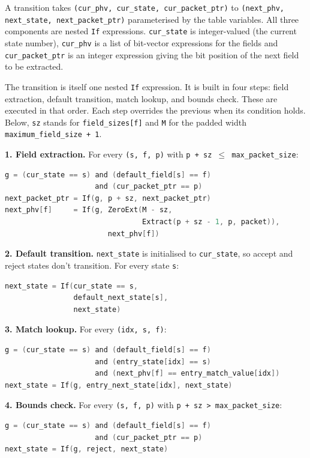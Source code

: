 A transition takes
\texttt{(cur\_phv, cur\_state, cur\_packet\_ptr)} to
\texttt{(next\_phv, next\_state, next\_packet\_ptr)} parameterised
by the table variables. All three components are nested \texttt{If} expressions.
\texttt{cur\_state} is integer-valued (the current state number),
\texttt{cur\_phv} is a list of bit-vector expressions for the fields and
\texttt{cur\_packet\_ptr} is an integer expression giving the bit
position of the next field to be extracted.

The transition is itself one nested \texttt{If} expression. It is
built in four steps: field extraction, default transition,
match lookup, and bounds check. These are executed in that order.
Each step overrides the previous when its condition holds. 
Below, \texttt{sz} stands for \texttt{field\_sizes[f]} and \texttt{M} for
the padded width \texttt{maximum\_field\_size + 1}.

\textbf{1. Field extraction.} For every \texttt{(s, f, p)} with
\texttt{p + sz $\le$ max\_packet\_size}:
\begin{lstlisting}[style=codeside, language=C]
g = (cur_state == s) and (default_field[s] == f)
                     and (cur_packet_ptr == p)
next_packet_ptr = If(g, p + sz, next_packet_ptr)
next_phv[f]     = If(g, ZeroExt(M - sz,
                                Extract(p + sz - 1, p, packet)),
                        next_phv[f])
\end{lstlisting}

\textbf{2. Default transition.} \texttt{next\_state} is initialised
to \texttt{cur\_state}, so accept and reject states don't transition.
For every state \texttt{s}:
\begin{lstlisting}[style=codeside, language=C]
next_state = If(cur_state == s,
                default_next_state[s],
                next_state)
\end{lstlisting}

\textbf{3. Match lookup.} For every \texttt{(idx, s, f)}:
\begin{lstlisting}[style=codeside, language=C]
g = (cur_state == s) and (default_field[s] == f)
                     and (entry_state[idx] == s)
                     and (next_phv[f] == entry_match_value[idx])
next_state = If(g, entry_next_state[idx], next_state)
\end{lstlisting}

\textbf{4. Bounds check.} For every \texttt{(s, f, p)} with
\texttt{p + sz > max\_packet\_size}:
\begin{lstlisting}[style=codeside, language=C]
g = (cur_state == s) and (default_field[s] == f)
                     and (cur_packet_ptr == p)
next_state = If(g, reject, next_state)
\end{lstlisting}

